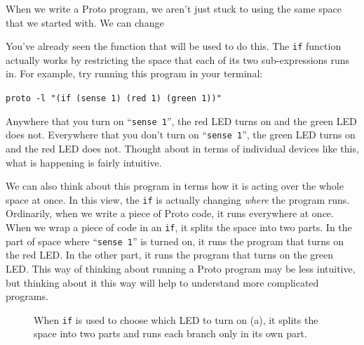 \documentclass{article}
\newcommand\code[1]{\begin{center}\var{#1}\end{center}}
\newcommand\var[1]{{\tt #1}}
\newcommand\qvar[1]{``{\tt #1}''}
\begin{document}
When we write a Proto program, we aren't just stuck to using the same
space that we started with.  We can change 

You've already seen the function that will be used to do this.  The
\var{if} function actually works by restricting the space that each of
its two sub-expressions runs in.  For example, try running this
program in your terminal:

\code{proto -l "(if (sense 1) (red 1) (green 1))"}

Anywhere that you turn on \qvar{sense 1}, the red LED turns on and the
green LED does not.  Everywhere that you don't turn on \qvar{sense 1},
the green LED turns on and the red LED does not.  Thought about in
terms of individual devices like this, what is happening is fairly
intuitive.

We can also think about this program in terms how it is acting over
the whole space at once.  In this view, the \var{if} is actually
changing {\em where} the program runs.  Ordinarily, when we write a
piece of Proto code, it runs everywhere at once.  When we wrap a piece
of code in an \var{if}, it splits the space into two parts.  In the
part of space where \qvar{sense 1} is turned on, it runs the program
that turns on the red LED.  In the other part, it runs the program
that turns on the green LED.  This way of thinking about running a
Proto program may be less intuitive, but thinking about it this way
will help to understand more complicated programs.

\begin{figure}[ht]
\centering
{}
\caption{When \var{if} is used to choose which LED to turn on (a), it
  splits the space into two parts and runs each branch only in its own
  part.}
\label{f:restriction}
\end{figure}
\end{document}
